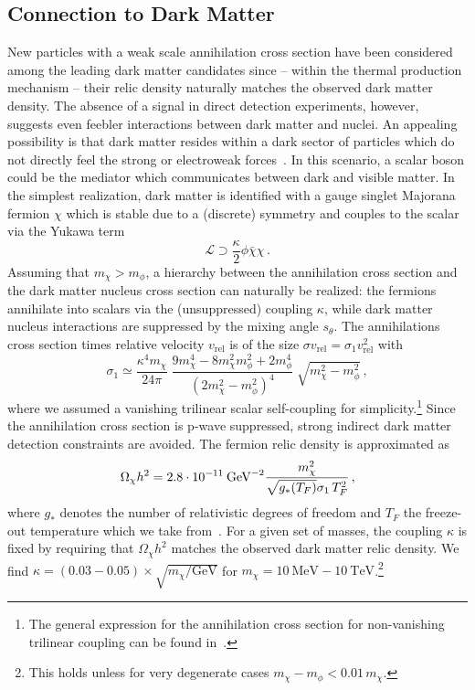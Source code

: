 \documentclass[preprintnumbers,twocolumn,aps,floats,nofootinbib]{revtex4-1}
\newcommand{\eVdist}{\kern-0.06em}
\newcommand{\gev}{\:\text{Ge\eVdist V}}
\begin{document}
\subsection{Connection to Dark Matter}\label{sec:darkmatter}
New particles with a weak scale annihilation cross section have been considered among the leading dark matter candidates since --  within the thermal production mechanism -- their relic density naturally matches the observed dark matter density. The absence of a signal in direct detection experiments, however, suggests even feebler interactions between dark matter and nuclei. An appealing possibility is that dark matter resides within a dark sector of particles which do not directly feel the strong or electroweak forces~\cite{Pospelov:2007mp}. In this scenario, a scalar boson could be the mediator which communicates between dark and visible matter. In the simplest realization, dark matter is identified with a gauge singlet Majorana fermion $\chi$ which is stable due to a (discrete) symmetry and couples to the scalar via the Yukawa term~\cite{Kappl:2010qx,Schmidt-Hoberg:2013hba}
\begin{equation}
 \mathcal{L}\supset \frac{\kappa}{2}\phi\bar{\chi}\chi\,.
\end{equation}
Assuming that $m_{\chi}> m_{\phi}$, a hierarchy between the annihilation cross section and the dark matter nucleus cross section can naturally be realized: the fermions annihilate into scalars via the (unsuppressed) coupling $\kappa$, while dark matter nucleus interactions are suppressed by the mixing angle $s_{\theta}$. The annihilations cross section times relative velocity $v_{\text{rel}}$ is of the size $\sigma v_{\text{rel}}= \sigma_1 v_{\text{rel}}^2$ with~\cite{Kappl:2010qx,Winkler:2012xwa}
\begin{equation}
 \sigma_1 \simeq \frac{\kappa^4 m_\chi}{24\pi}\;\frac{9 m_\chi^4-8m_\chi^2 m_\phi^2 +2m_\phi^4}{(2m_\chi^2-m_\phi^2)^4}\;\sqrt{m_\chi^2-m_\phi^2}\,,
\end{equation}
where we assumed a vanishing trilinear scalar self-coupling for simplicity.\footnote{The general expression for the annihilation cross section for non-vanishing trilinear coupling can be found in~\cite{Winkler:2012xwa}.} Since the annihilation cross section is p-wave suppressed, strong indirect dark matter detection constraints are avoided. The fermion relic density is approximated as~\cite{Drees:2009bi}
\begin{equation}
 \Omega_\chi h^2=2.8\cdot 10^{-11}\gev^{-2}\frac{m_\chi^2}{\sqrt{g_*(T_F)}\sigma_1\,T_F^2}\,,
\end{equation}
where $g_*$ denotes the number of relativistic degrees of freedom and $T_F$ the freeze-out temperature which we take from~\cite{Steigman:2012nb}. For a given set of masses, the coupling $\kappa$ is fixed by requiring that $\Omega_\chi h^2$ matches the observed dark matter relic density. We find $\kappa=(0.03-0.05)\times\sqrt{m_\chi/\text{GeV}}$ for $m_\chi=10\:\text{MeV}-10\:\text{TeV}$.\footnote{This holds unless for very degenerate cases $m_\chi-m_\phi< 0.01\, m_\chi$.}
\end{document}
